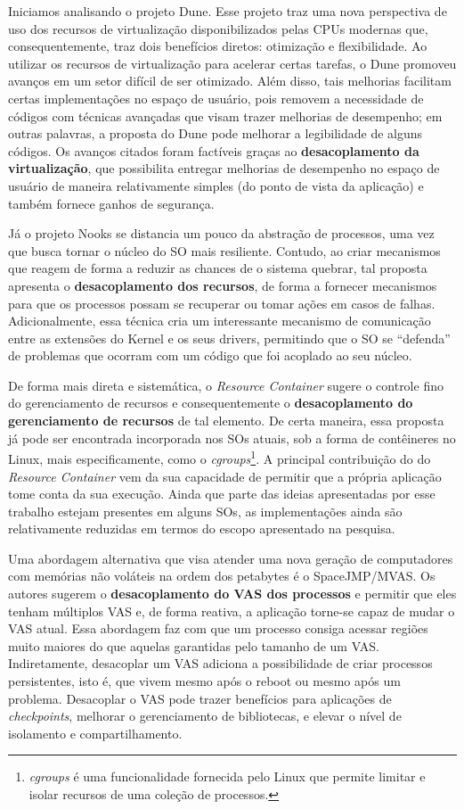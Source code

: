 Iniciamos analisando o projeto Dune. Esse projeto traz uma nova perspectiva de uso dos recursos de virtualização
disponibilizados pelas CPUs modernas que, consequentemente, traz dois
benefícios diretos: otimização e flexibilidade. Ao utilizar os recursos de
virtualização para acelerar certas tarefas, o Dune promoveu avanços em um setor
difícil de ser otimizado. Além disso, tais melhorias facilitam certas
implementações no espaço de usuário, pois removem a necessidade de códigos com
técnicas avançadas que visam trazer melhorias de desempenho; em outras
palavras, a proposta do Dune pode melhorar a legibilidade de alguns códigos.
Os avanços citados foram factíveis graças ao \textbf{desacoplamento da
virtualização}, que possibilita entregar melhorias de desempenho no
espaço de usuário de maneira relativamente simples (do ponto de vista da
aplicação) e também fornece ganhos de segurança.

Já o projeto Nooks se distancia um pouco da abstração de processos, uma vez que
busca tornar o núcleo do SO mais resiliente. Contudo, ao criar mecanismos
que reagem de forma a reduzir as chances de o sistema quebrar, tal proposta
apresenta o \textbf{desacoplamento dos recursos}, de forma a fornecer mecanismos
para que os processos possam se recuperar ou tomar ações em casos de falhas.
Adicionalmente, essa técnica cria um interessante mecanismo de
comunicação entre as extensões do Kernel e os seus drivers, permitindo que o SO
se ``defenda'' de problemas que ocorram com um código que foi acoplado ao seu
núcleo.

De forma mais direta e sistemática, o \textit{Resource Container} sugere o
controle fino do gerenciamento de recursos e consequentemente o
\textbf{desacoplamento do gerenciamento de recursos} de tal elemento. De certa
maneira, essa proposta já pode ser encontrada incorporada nos SOs atuais, sob a
forma de contêineres no Linux, mais especificamente, como o
\textit{cgroups}\footnote{\emph{cgroups} é uma funcionalidade fornecida pelo
Linux que permite limitar e isolar recursos de uma coleção de processos.}. A
principal contribuição do do \emph{Resource Container} vem da sua capacidade de permitir que a
própria aplicação tome conta da sua execução.  Ainda que parte das ideias
apresentadas por esse trabalho estejam presentes em alguns SOs, as
implementações ainda são relativamente reduzidas em termos do escopo
apresentado na pesquisa.

Uma abordagem alternativa que visa atender uma nova geração de computadores com
memórias não voláteis na ordem dos petabytes é o SpaceJMP/MVAS.  Os autores
sugerem o \textbf{desacoplamento do VAS dos processos} e permitir que eles tenham
múltiplos VAS e, de forma reativa, a aplicação torne-se capaz de mudar o VAS
atual. Essa abordagem faz com que um processo consiga acessar regiões muito
maiores do que aquelas garantidas pelo tamanho de um VAS. Indiretamente,
desacoplar um VAS adiciona a possibilidade de criar processos persistentes,
isto é, que vivem mesmo após o reboot ou mesmo após um problema. Desacoplar o VAS
pode trazer benefícios para aplicações de \textit{checkpoints}, melhorar o
gerenciamento de bibliotecas, e elevar o nível de isolamento e compartilhamento.

